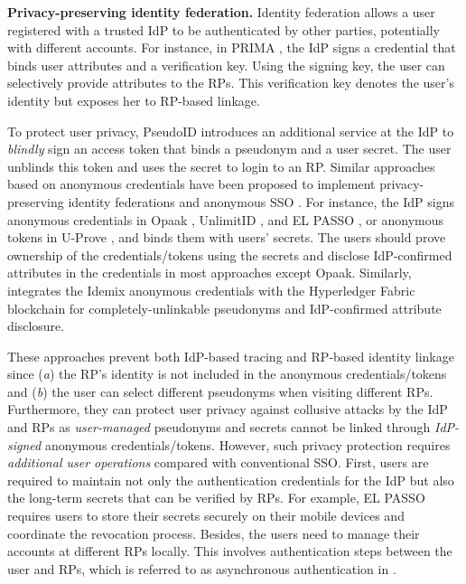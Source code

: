 \noindent\textbf{Privacy-preserving identity federation.} Identity federation allows a user registered with a trusted IdP to be authenticated by other parties, potentially with different accounts. For instance, in PRIMA \cite{prima}, the IdP signs a credential
that binds user attributes and a verification key. Using the signing key, the user can selectively provide attributes to the RPs. %
This verification key denotes the user's identity but exposes her to RP-based linkage.

To protect user privacy, PseudoID \cite{PseudoID} introduces an additional service at the IdP to \emph{blindly} sign %
an access token that binds a pseudonym and a user secret. The user unblinds this token and uses the secret to login to an RP. Similar approaches based on anonymous credentials \cite{anon-credential-2001, idemix, anon-credential} have been proposed to implement privacy-preserving identity federations \cite{PseudoID, hyperledge-idemix, Opaak, uprov, UnlimitID} and anonymous SSO \cite{ELPASSO}. For instance, the IdP signs anonymous credentials in Opaak \cite{Opaak}, UnlimitID \cite{UnlimitID}, and EL PASSO \cite{ELPASSO}, or anonymous tokens in U-Prove \cite{uprov,uprove-conference}, and binds them with users' secrets. %
The users should prove ownership of the credentials/tokens using the secrets and disclose IdP-confirmed attributes in the credentials in most approaches except Opaak. Similarly, \cite{hyperledge-idemix} integrates the Idemix anonymous credentials \cite{idemix} with the Hyperledger Fabric blockchain for completely-unlinkable pseudonyms and IdP-confirmed attribute disclosure.

These approaches prevent both IdP-based tracing and RP-based identity linkage since (\emph{a}) the RP's identity is not included in the anonymous credentials/tokens and (\emph{b}) the user can select different pseudonyms when visiting different RPs. Furthermore, they can protect user privacy against collusive attacks by the IdP and RPs as \emph{user-managed} pseudonyms and secrets cannot be linked through \emph{IdP-signed} anonymous credentials/tokens.
However, such privacy protection requires \emph{additional user operations} compared with conventional SSO.
First, users are required to maintain not only the authentication credentials for the IdP but also the long-term secrets that can be verified by RPs. For example, EL PASSO \cite{ELPASSO} requires users to store their secrets securely on their mobile devices and coordinate the revocation process. Besides, the users need to manage their accounts at different RPs locally. This involves authentication steps between the user and RPs, which is referred to as asynchronous authentication in \cite{ELPASSO}.

